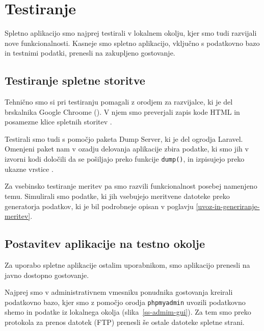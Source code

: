 \documentclass[a4paper, 12pt]{book}
\begin{document}
\chapter{Testiranje}
\label{testiranje}

Spletno aplikacijo smo najprej testirali v lokalnem okolju, kjer smo tudi razvijali nove funkcionalnosti. Kasneje smo spletno aplikacijo, vključno s podatkovno bazo in testnimi podatki, prenesli na zakupljeno gostovanje.

\section{Testiranje spletne storitve}

Tehnično smo si pri testiranju pomagali z orodjem za razvijalce, ki je del brskalnika Google Chroome (). V njem smo preverjali zapis kode HTML in posamezne klice spletnih storitev \cite{google-devtools}.

Testirali smo tudi s pomočjo paketa Dump Server, ki je del ogrodja Laravel. Omenjeni paket nam v ozadju delovanja aplikacije zbira podatke, ki smo jih v izvorni kodi določili da se pošiljajo preko funkcije \verb=dump()=, in izpisujejo preko ukazne vrstice \cite{laravel-dump}.

Za vsebinsko testiranje meritev pa smo razvili funkcionalnost posebej namenjeno temu. Simulirali smo podatke, ki jih vsebujejo meritvene datoteke preko generatorja podatkov, ki je bil podrobneje opisan v poglavju \ref{uvoz-in-generiranje-meritev}.


\section{Postavitev aplikacije na testno okolje}

Za uporabo spletne aplikacije ostalim uporabnikom, smo aplikacijo prenesli na javno dostopno gostovanje. 

Najprej smo v administrativnem vmesniku ponudnika gostovanja kreirali podatkovno bazo, kjer smo z pomočjo orodja \verb=phpmyadmin= \cite{phpmyadmin-framework} uvozili podatkovno shemo in podatke iz lokalnega okolja (slika~\ref{ss-admim-gui}). Za tem smo preko protokola za prenos datotek (FTP) prenesli še ostale datoteke spletne strani.
\end{document}
